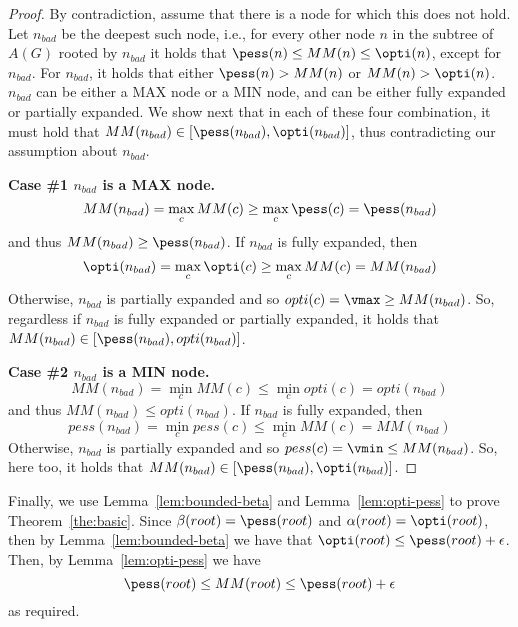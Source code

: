 \begin{proof}
By contradiction, assume that there is a node for which this does not hold. 
Let $n_{bad}$ be the deepest such node, i.e., 
for every other node $n$ in the subtree of $A(G)$ rooted by $n_{bad}$ 
it holds that $\pess(n)\leq MM(n)\leq \opti(n)$, except for $n_{bad}$. For $n_{bad}$, it holds that either $\pess(n)>MM(n)$ or $MM(n)>\opti(n)$.
$n_{bad}$ can be either a MAX node or a MIN node, 
and can be either fully expanded or partially expanded. We show next that in each of these four combination, it must hold that $MM(n_{bad})\in [\pess(n_{bad}),\opti(n_{bad})]$, thus contradicting our assumption about $n_{bad}$. 


\noindent \textbf{Case \#1 $n_{bad}$ is a MAX node.}
\[ MM(n_{bad}) = \max_c MM(c) \geq \max_c \pess(c) = \pess(n_{bad}) \]
and thus $MM(n_{bad})\geq \pess(n_{bad})$. 
If $n_{bad}$ is fully expanded, then 
\[ \opti(n_{bad}) = \max_c \opti(c) \geq \max_c MM(c) = MM(n_{bad}) \]
Otherwise, $n_{bad}$ is partially expanded and so $opti(c)=\vmax\geq MM(n_{bad})$. So, regardless if $n_{bad}$ is fully expanded or partially expanded, it holds that $MM(n_{bad})\in [\pess(n_{bad}), opti(n_{bad})]$. 

\noindent \textbf{Case \#2 $n_{bad}$ is a MIN node.}
\[ MM(n_{bad}) = \min_c MM(c) \leq \min_c opti(c) = opti(n_{bad}) \]
and thus $MM(n_{bad})\leq opti(n_{bad})$. 
If $n_{bad}$ is fully expanded, then 
\[ pess(n_{bad}) = \min_c pess(c) \leq \min_c MM(c) = MM(n_{bad}) \]
Otherwise, $n_{bad}$ is partially expanded and so $pess(c)=\vmin\leq MM(n_{bad})$. So, here too, it holds that $MM(n_{bad})\in
[\pess(n_{bad}), \opti(n_{bad})]$. 
\end{proof}

Finally, we use Lemma~\ref{lem:bounded-beta} and Lemma~\ref{lem:opti-pess} to prove Theorem~\ref{the:basic}. 
Since $\beta(root)=\pess(root)$ 
and $\alpha(root)=\opti(root)$, then by Lemma~\ref{lem:bounded-beta} we have that
$\opti(root)\leq \pess(root)+\epsilon$.
Then, by Lemma~\ref{lem:opti-pess} we have
\begin{equation}
\pess(root) \leq MM(root) \leq \pess(root)+\epsilon
\end{equation}
as required.















